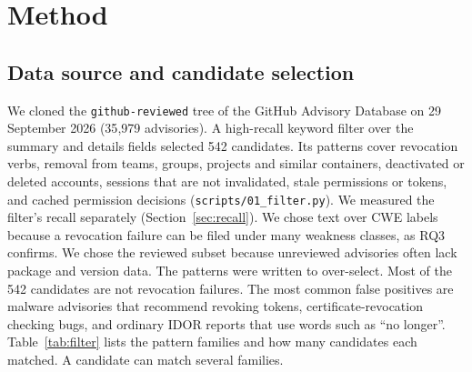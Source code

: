 \documentclass[preprint,12pt]{elsarticle}
\begin{document}
\section{Method}

\subsection{Data source and candidate selection}
We cloned the \texttt{github-reviewed} tree of the GitHub Advisory Database on 29 September 2026
(35{,}979 advisories). A high-recall keyword filter over the summary and details fields selected
542 candidates. Its patterns cover revocation verbs, removal from teams, groups, projects and similar containers, deactivated or
deleted accounts, sessions that are not invalidated, stale permissions or tokens, and cached permission
decisions (\texttt{scripts/01\_filter.py}). We measured the filter's recall separately (Section~\ref{sec:recall}).
We chose text over CWE labels because a revocation failure can be filed under many weakness classes, as RQ3 confirms.
We chose the reviewed subset because unreviewed advisories often lack package and version data. The patterns were
written to over-select. Most of the 542 candidates are not revocation failures. The most common false positives are
malware advisories that recommend revoking tokens, certificate-revocation checking bugs, and ordinary IDOR reports that
use words such as ``no longer''.
Table~\ref{tab:filter} lists the pattern families and how many candidates each matched. A candidate can
match several families.
\end{document}
